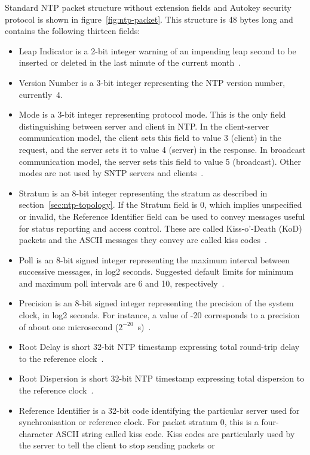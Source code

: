 Standard NTP packet structure without extension fields and
Autokey security protocol is shown in figure~\ref{fig:ntp-packet}.
This structure is 48 bytes long and contains the following thirteen fields:
\begin{itemize}
\item
Leap Indicator is a 2-bit integer warning of an impending leap
second to be inserted or deleted in the last minute of the current month~\cite{rfc5905}.
\item
Version Number is a 3-bit integer representing the NTP
version number, currently~4.
\item
Mode is a 3-bit integer representing protocol mode.
This is the only field distinguishing between server and client in NTP.
In the client-server communication model, the client sets this field to value 3 (client) in the request,
and the server sets it to value 4 (server) in the response.
In broadcast communication model, the server sets this field to value 5 (broadcast).
Other modes are not used by SNTP servers and clients~\cite{rfc5905}.
\item
Stratum is an 8-bit integer representing the stratum as described in section~\ref{sec:ntp-topology}.
If the Stratum field is 0, which implies unspecified or invalid, the
Reference Identifier field can be used to convey messages useful for
status reporting and access control.
These are called Kiss-o'-Death (KoD)
packets and the ASCII messages they convey are called kiss codes~\cite{rfc5905}.
\item
Poll is an 8-bit signed integer representing the maximum interval between
successive messages, in log2 seconds.
Suggested default limits for minimum and maximum poll intervals are 6 and 10, respectively~\cite{rfc5905}.
\item
Precision is an 8-bit signed integer representing the precision of the
system clock, in log2 seconds.
For instance, a value of -20
corresponds to a precision of about one microsecond ($2^{-20}$~s)~\cite{rfc5905}.
\item
Root Delay is short 32-bit NTP timestamp expressing
total round-trip delay to the reference clock~\cite{rfc5905}.
\item
Root Dispersion is short 32-bit NTP timestamp expressing
total dispersion to the reference clock~\cite{rfc5905}.
\item
Reference Identifier is a 32-bit code identifying the particular server used for synchronisation
or reference clock.
For packet stratum 0, this is a four-character ASCII string called kiss code.
Kiss codes are particularly used by the server to tell the client to stop sending packets or

\end{itemize}
